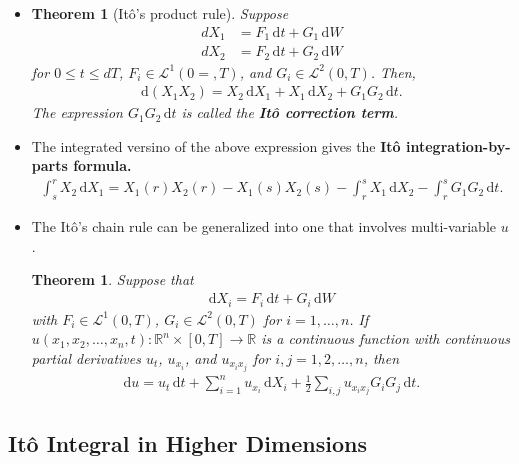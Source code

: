 \documentclass[10pt]{article}
\newtheorem{theorem}[lemma]{Theorem}
\newcommand{\dee}{\mathrm{d}}
\newcommand{\mcal}[1]{\mathcal{#1}}
\newcommand{\Real}{\mathbb{R}}
\begin{document}
\begin{itemize}
  \item \begin{theorem}[It\^{o}'s product rule]
    Suppose 
    \begin{align*}    
      dX_1 &= F_1\, \dee t + G_1\, \dee W \\
      dX_2 &= F_2\, \dee t + G_2\, \dee W
    \end{align*}
    for $0 \leq t \leq dT$, $F_i \in \mcal{L}^1(0=,T)$, and $G_i \in \mcal{L}^2(0,T)$. Then,
    \begin{align*}
      \dee(X_1 X_2) = X_2\, \dee X_1 + X_1\, \dee X_2 + G_1G_2\, \dee t.
    \end{align*}
    The expression $G_1 G_2\, \dee t$ is called the {\bf It\^{o} correction term}.
  \end{theorem}

  \item The integrated versino of the above expression gives the {\bf It\^{o} integration-by-parts formula.}
  \begin{align*}
    \int_s^r X_2\, \dee X_1 = X_1(r)X_2(r) - X_1(s)X_2(s) - \int_r^s X_1\, \dee X_2 - \int_r^s G_1 G_2\, \dee t.
  \end{align*}

  \item The It\^{o}'s chain rule can be generalized into one that involves multi-variable $u$.
  
  \begin{theorem}
    Suppose that
    \begin{align*}
      \dee X_i = F_i\, \dee t + G_i\, \dee W
    \end{align*}
    with $F_i \in \mcal{L}^1(0,T)$, $G_i \in \mcal{L}^2(0,T)$ for $i = 1, \dotsc, n$. If $u(x_1, x_2, \dotsc, x_n, t): \Real^n \times [0,T] \rightarrow \Real$ is a continuous function with continuous partial derivatives $u_t$, $u_{x_i}$, and $u_{x_i x_j}$ for $i,j = 1, 2, \dotsc, n$, then
    \begin{align*}
      \dee u = u_t\, \dee t + \sum_{i=1}^n u_{x_i}\, \dee X_i + \frac{1}{2}\sum_{i,j} u_{x_i x_j} G_i G_j\, \dee t.
    \end{align*}
  \end{theorem}
\end{itemize}

\subsection{It\^{o} Integral in Higher Dimensions}
\end{document}
